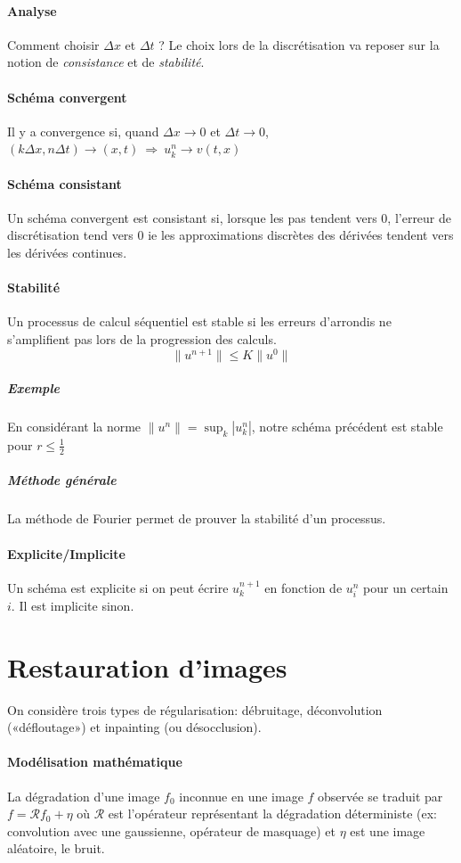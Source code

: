 \documentclass[french]{article}
\begin{document}
\paragraph{Analyse} Comment choisir $\Delta x$ et $\Delta t$ ? Le choix
lors de la discrétisation va reposer sur la notion de \emph{consistance}
et de \emph{stabilité}.

\paragraph{Schéma convergent} Il y a convergence si, quand $\Delta x \to 0$
et $\Delta t \to 0$, $(k\Delta x, n\Delta t) \to (x,t)\ \Rightarrow\ u_k^n \to v(t,x)$

\paragraph{Schéma consistant} Un schéma convergent est consistant si,
lorsque les pas tendent vers $0$, l'erreur de discrétisation tend vers $0$ ie
les approximations discrètes des dérivées tendent vers les dérivées continues.

\paragraph{Stabilité}Un processus de calcul séquentiel est stable si les
erreurs d'arrondis ne s'amplifient pas lors de la progression des calculs.
$$\|u^{n+1} \| \le K\|u^0\|$$

\subparagraph{Exemple} En considérant la norme $\|u^n\| = \sup_k{|u_k^n|}$,
notre schéma précédent est stable pour $r \le \frac{1}{2}$

\subparagraph{Méthode générale}La méthode de Fourier permet de prouver
la stabilité d'un processus.

\paragraph{Explicite/Implicite} Un schéma est explicite si on peut écrire
$u_k^{n+1}$ en fonction de $u_i^n$ pour un certain $i$. Il est implicite
sinon.

\section{Restauration d'images}
On considère trois types de régularisation: débruitage, déconvolution
(«défloutage») et inpainting (ou désocclusion).

\paragraph{Modélisation mathématique} La dégradation d'une image $f_0$
inconnue en une image $f$ observée se traduit par $f = \mathcal{R} f_0 + \eta$
où $\mathcal{R}$ est l'opérateur représentant la dégradation déterministe
(ex: convolution avec une gaussienne, opérateur de masquage) et $\eta$ est
une image aléatoire, le bruit.
\end{document}
